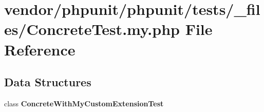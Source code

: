 \section{vendor/phpunit/phpunit/tests/\+\_\+files/\+Concrete\+Test.my.\+php File Reference}
\label{_concrete_test_8my_8php}
\subsection*{Data Structures}
\begin{DoxyCompactItemize}
\item 
class {\bf Concrete\+With\+My\+Custom\+Extension\+Test}
\end{DoxyCompactItemize}
